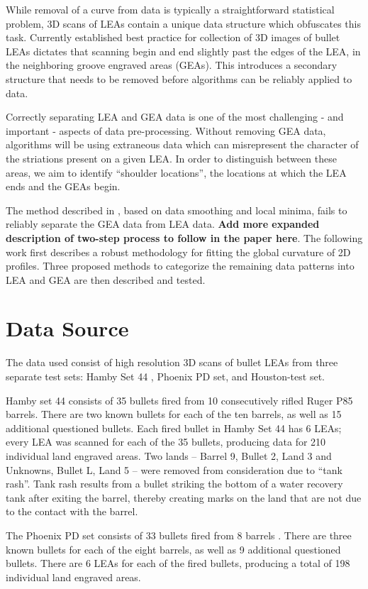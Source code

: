 \documentclass[12pt]{article}
\begin{document}
While removal of a curve from data is typically a straightforward
statistical problem, 3D scans of LEAs contain a unique data structure
which obfuscates this task. Currently established best practice for
collection of 3D images of bullet LEAs dictates that scanning begin and
end slightly past the edges of the LEA, in the neighboring groove
engraved areas (GEAs). This introduces a secondary structure that needs
to be removed before algorithms can be reliably applied to data.

Correctly separating LEA and GEA data is one of the most challenging -
and important - aspects of data pre-processing. Without removing GEA
data, algorithms will be using extraneous data which can misrepresent
the character of the striations present on a given LEA. In order to
distinguish between these areas, we aim to identify ``shoulder
locations'', the locations at which the LEA ends and the GEAs begin.

The method described in \citet{Hare1}, based on data smoothing and local
minima, fails to reliably separate the GEA data from LEA data.
\textbf{Add more expanded description of two-step process to follow in
the paper here}. The following work first describes a robust methodology
for fitting the global curvature of 2D profiles. Three proposed methods
to categorize the remaining data patterns into LEA and GEA are then
described and tested.

\section{Data Source}

The data used consist of high resolution 3D scans of bullet LEAs from
three separate test sets: Hamby Set 44 \citep{Hamby}, Phoenix PD set,
and Houston-test set.

Hamby set 44 consists of 35 bullets fired from 10 consecutively rifled
Ruger P85 barrels. There are two known bullets for each of the ten
barrels, as well as 15 additional questioned bullets. Each fired bullet
in Hamby Set 44 has 6 LEAs; every LEA was scanned for each of the 35
bullets, producing data for 210 individual land engraved areas. Two
lands -- Barrel 9, Bullet 2, Land 3 and Unknowns, Bullet L, Land 5 --
were removed from consideration due to ``tank rash''. Tank rash results
from a bullet striking the bottom of a water recovery tank after exiting
the barrel, thereby creating marks on the land that are not due to the
contact with the barrel.

The Phoenix PD set consists of 33 bullets fired from 8 barrels
. There are three known
bullets for each of the eight barrels, as well as 9 additional
questioned bullets. There are 6 LEAs for each of the fired bullets,
producing a total of 198 individual land engraved areas.
\end{document}
